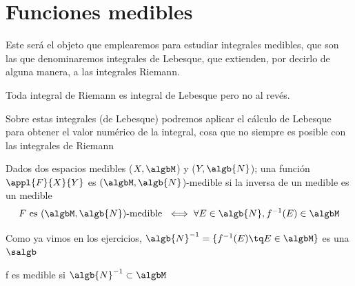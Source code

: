 \documentclass{apuntes}
\begin{document}
\chapter{Funciones medibles}
Este será el objeto que emplearemos para estudiar integrales medibles, que son las que denominaremos integrales de Lebesque, que extienden, por decirlo de alguna manera, a las integrales Riemann.

Toda integral de Riemann es integral de Lebesque pero no al revés.

Sobre estas integrales (de Lebesque) podremos aplicar el cálculo de Lebesque para obtener el valor numérico de la integral, cosa que no siempre es posible con las integrales de Riemann

\begin{defn}
Dados dos espacios medibles ($X, \algbM$) y ($Y, \algb{N}$); una función $\appl{F}{X}{Y}$ es $(\algbM,\algb{N}$)-medible si la inversa de un medible es un medible
\[F \text{ es }  (\algbM,\algb{N})\text{-medible } \iff \forall E \in \algb{N}, f^{-1}(E)\in \algbM\]
\end{defn}

Como ya vimos en los ejercicios, $\algb{N}^{-1}=\{f^{-1}(E) \tq E \in \algbM\}$ es una $\salgb$

\obs f es medible si $\algb{N}^{-1} \subset \algbM$
\end{document}
